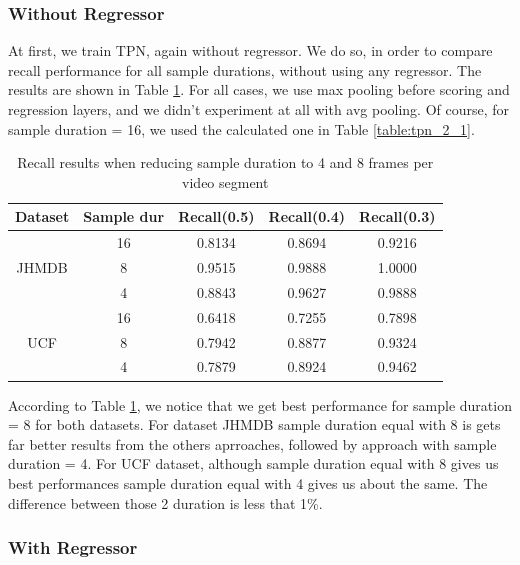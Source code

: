 \subsubsection{Without Regressor}

At first, we train TPN, again without regressor. We do so, in order to compare recall performance for all sample durations, without using any regressor. The results
are shown in Table \ref{table:new_sample}. For all cases, we use max pooling before scoring and regression layers, and we didn't experiment at all with
avg pooling. Of course, for sample duration = 16, we used the calculated one in  Table \ref{table:tpn_2_1}.

\begin{table}[h]
  \centering
  \begin{tabular}{|c | c || c c c|}
    \hline
    \textbf{Dataset} & \textbf{Sample dur} & \textbf{Recall(0.5)} &  \textbf{Recall(0.4)} &  \textbf{Recall(0.3)} \\
    \hline
    \multirow{3}{*}{JHMDB} & 16 & 0.8134 & 0.8694 & 0.9216 \\
    \cline{2-5}
    {} & 8 & 0.9515 & 0.9888 & 1.0000 \\
    \cline{2-5}
    {} & 4 & 0.8843 & 0.9627 & 0.9888 \\
    \hline
    \multirow{3}{*}{UCF} & 16 & 0.6418 & 0.7255 & 0.7898 \\
    \cline{2-5}
    {} & 8 & 0.7942 & 0.8877 & 0.9324\\
    \cline{2-5}
    {} & 4 & 0.7879 & 0.8924 & 0.9462 \\
    \hline
    
  \end{tabular}
  \caption{Recall results when reducing sample duration to 4 and 8 frames per video segment}
  \label{table:new_sample}
\end{table}

According to Table \ref{table:new_sample}, we notice that we get best performance for sample duration = 8 for both datasets. For dataset JHMDB sample duration equal with 8
is gets far better results from the others aprroaches, followed by approach with sample duration = 4. For UCF dataset, although sample duration equal with 8 gives us best performances
sample duration equal with 4 gives us about the same. The difference between those 2 duration is less that 1\%. 

\subsubsection{With Regressor}                                             

